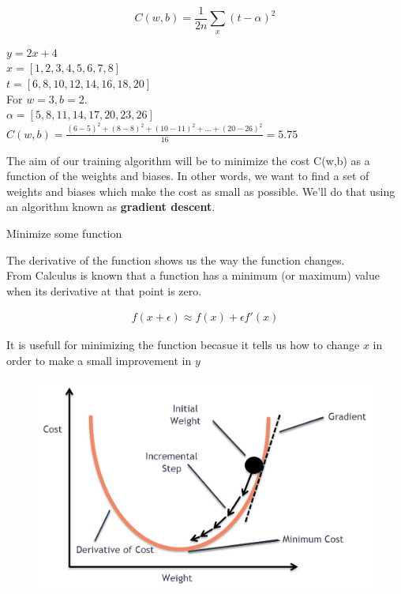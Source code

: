 \documentclass[10pt, compress]{beamer}
\begin{document}
\begin{frame}

  $$ C(w, b) = \frac{1}{2n}\sum_x (t-\alpha)^2$$

  $ y = 2x + 4$ \\
  $x = [1, 2, 3, 4, 5, 6, 7, 8]$ \\
  $t = [6, 8, 10, 12, 14, 16, 18, 20]$ \\

  For $w = 3, b = 2$. \\
  $\alpha = [5, 8, 11, 14, 17, 20, 23, 26]$ \\ \hfill \break
  $C(w, b) = \frac{(6-5)^2 + (8-8)^2 + (10-11)^2 + ... + (20-26)^2}{16} = 5.75$ \\ \hfill \break

  The aim of our training algorithm will be to minimize the cost C(w,b) as a function of the weights and biases. In other words, we want to find a set of weights and biases which make the cost as small as possible. We'll do that using an algorithm known as \textbf{gradient descent}.
\end{frame}

\begin{frame}
   Minimize some function \\

   \begin{multicols}{2}
     The derivative of the function shows us the way the function changes. \\
     From Calculus is known that a function has a minimum (or maximum) value when its derivative at that point is zero.

     \begin{eqnarray}
     f\left(x + \epsilon\right) \approx f\left(x\right) + \epsilon f'\left(x\right)
     \nonumber
     \end{eqnarray}

     It is usefull for minimizing the function becasue it tells us how to change $x$ in order to make a small improvement in $y$


     \columnbreak
     \begin{figure}
       \includegraphics[width=1\linewidth]{imgs/gd_3}
     \end{figure}
  \end{multicols}
\end{frame}
\end{document}
